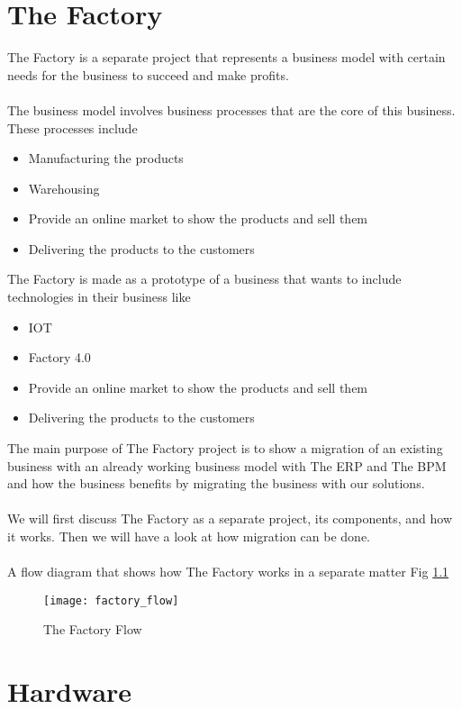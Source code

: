 \chapter{The Factory}
The Factory is a separate project that represents a business model with certain needs for the business
to succeed and make profits.\\\\
The business model involves business processes that are the core of this business. These processes
include
\begin{itemize}
    \item Manufacturing the products
    \item Warehousing
    \item Provide an online market to show the products and sell them
    \item Delivering the products to the customers
\end{itemize}

The Factory is made as a prototype of a business that wants to include technologies in their business
like
\begin{itemize}
    \item IOT
    \item Factory 4.0
    \item Provide an online market to show the products and sell them
    \item Delivering the products to the customers
\end{itemize}

The main purpose of The Factory project is to show a migration of an existing business with an
already working business model with The ERP and The BPM and how the business benefits by
migrating the business with our solutions.\\\\
We will first discuss The Factory as a separate project, its components, and how it works. Then we
will have a look at how migration can be done.\\\\
A flow diagram that shows how The Factory works in a separate matter Fig \ref{fig:factory_flow}

\begin{figure}[h]
    \texttt{[image: factory\_flow]}
    \centering
    \caption{The Factory Flow}
    \label{fig:factory_flow}
\end{figure}


\chapter{Hardware}

